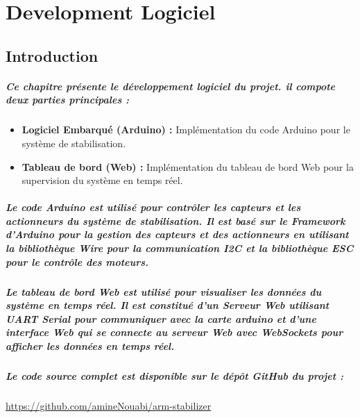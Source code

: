 \chapter{Development Logiciel}
\label{cp:implementation}

\section{Introduction}

\paragraph{Ce chapitre présente le développement logiciel du projet. il compote deux parties principales :}

\begin{itemize}
	\item \textbf{Logiciel Embarqué (Arduino) :} Implémentation du code Arduino pour le système de stabilisation.
	\item \textbf{Tableau de bord (Web) :} Implémentation du tableau de bord Web pour la supervision du système en temps réel.
\end{itemize}

\paragraph{Le code Arduino est utilisé pour contrôler les capteurs et les actionneurs du système de stabilisation. Il est basé sur le Framework d'Arduino pour la gestion des capteurs et des actionneurs en utilisant la bibliothèque \textbf{Wire} pour la communication I2C et la bibliothèque \textbf{ESC} pour le contrôle des moteurs.}

\paragraph{Le tableau de bord Web est utilisé pour visualiser les données du système en temps réel. Il est constitué d'un Serveur Web utilisant UART Serial pour communiquer avec la carte arduino et d'une interface Web qui se connecte au serveur Web avec WebSockets pour afficher les données en temps réel.}

\paragraph{Le code source complet est disponible sur le dépôt GitHub du projet : }
\paragraph*{}
\url{https://github.com/amineNouabi/arm-stabilizer}
\newpage

